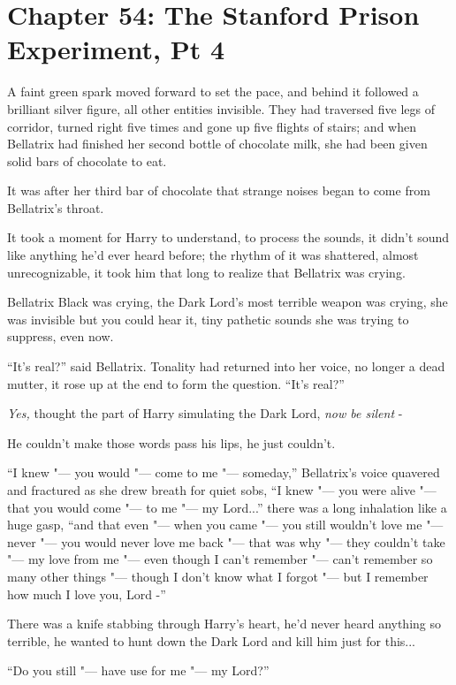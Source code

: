 \chapter{Chapter 54: The Stanford Prison Experiment, Pt 4}
A faint green spark moved forward to set the pace, and behind it
followed a brilliant silver figure, all other entities invisible. They
had traversed five legs of corridor, turned right five times and gone up
five flights of stairs; and when Bellatrix had finished her second
bottle of chocolate milk, she had been given solid bars of chocolate to
eat.

It was after her third bar of chocolate that strange noises began to
come from Bellatrix's throat.

It took a moment for Harry to understand, to process the sounds, it
didn't sound like anything he'd ever heard before; the rhythm of it was
shattered, almost unrecognizable, it took him that long to realize that
Bellatrix was crying.

Bellatrix Black was crying, the Dark Lord's most terrible weapon was
crying, she was invisible but you could hear it, tiny pathetic sounds
she was trying to suppress, even now.

``It's real?'' said Bellatrix. Tonality had returned into her voice, no
longer a dead mutter, it rose up at the end to form the question. ``It's
real?''

\emph{Yes,} thought the part of Harry simulating the Dark Lord,
\emph{now be silent} -

He couldn't make those words pass his lips, he just couldn't.

``I knew "--- you would "--- come to me "--- someday,'' Bellatrix's voice
quavered and fractured as she drew breath for quiet sobs, ``I knew "--- you
were alive "--- that you would come "--- to me "--- my Lord...'' there was a
long inhalation like a huge gasp, ``and that even "--- when you came "--- you
still wouldn't love me "--- never "--- you would never love me back "--- that was
why "--- they couldn't take "--- my love from me "--- even though I can't
remember "--- can't remember so many other things "--- though I don't know
what I forgot "--- but I remember how much I love you, Lord -''

There was a knife stabbing through Harry's heart, he'd never heard
anything so terrible, he wanted to hunt down the Dark Lord and kill him
just for this...

``Do you still "--- have use for me "--- my Lord?''

